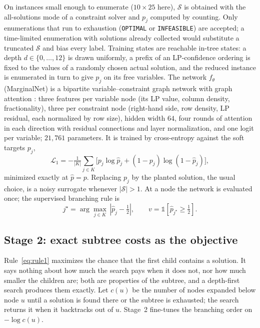 \documentclass[final,5p,times,twocolumn]{elsarticle}
\newcommand{\SOL}{\mathcal{S}}
\begin{document}
On instances small enough to enumerate ($10\times25$ here), $\SOL$ is obtained with the all-solutions mode of a constraint solver and $p_j$ computed by counting. Only enumerations that run to exhaustion (\texttt{OPTIMAL} or \texttt{INFEASIBLE}) are accepted; a time-limited enumeration with solutions already collected would substitute a truncated $\SOL$ and bias every label. Training states are reachable in-tree states: a depth $d\in\{0,\dots,12\}$ is drawn uniformly, a prefix of an LP-confidence ordering is fixed to the values of a randomly chosen actual solution, and the reduced instance is enumerated in turn to give $p_j$ on its free variables. The network $f_\theta$ (MarginalNet) is a bipartite variable--constraint graph network with graph attention \citep{velickovic2018graph}: three features per variable node (its LP value, column density, fractionality), three per constraint node (right-hand side, row density, LP residual, each normalized by row size), hidden width $64$, four rounds of attention in each direction with residual connections and layer normalization, and one logit per variable; $21{,}761$ parameters. It is trained by cross-entropy against the soft targets $p_j$,
\begin{equation}
\mathcal{L}_1=-\tfrac{1}{|K|}\sum_{j\in K}\bigl[p_j\log\hat p_j+(1-p_j)\log(1-\hat p_j)\bigr],
\label{eq:loss1}
\end{equation}
minimized exactly at $\hat p=p$. Replacing $p_j$ by the planted solution, the usual choice, is a noisy surrogate whenever $|\SOL|>1$. At a node the network is evaluated once; the supervised branching rule is
\begin{equation}
j^\star=\arg\max_{j\in K}\,|\hat p_j-\tfrac12|,\qquad v=\mathbb{1}[\hat p_{j^\star}\ge\tfrac12].
\label{eq:rule1}
\end{equation}

\subsection{Stage 2: exact subtree costs as the objective}
\label{sec:method-stage2}

Rule~\eqref{eq:rule1} maximizes the chance that the first child contains a solution. It says nothing about how much the search pays when it does not, nor how much smaller the children are; both are properties of the subtree, and a depth-first search produces them exactly. Let $c(u)$ be the number of nodes expanded below node $u$ until a solution is found there or the subtree is exhausted; the search returns it when it backtracks out of $u$. Stage~2 fine-tunes the branching order on $-\log c(u)$.
\end{document}
